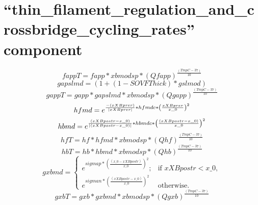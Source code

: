 \documentclass[10pt,landscape]{article}
\begin{document}
\section{``thin\_filament\_regulation\_and\_crossbridge\_cycling\_rates'' component}
\textbf{}
\begin{displaymath}fappT = fapp \ast xbmodsp \ast \left(Qfapp\right)^{\frac{\left(TmpC-37\right)}{10}}
\end{displaymath}
\textbf{}
\begin{displaymath}gapslmd = \left(1+\left(1-SOVFThick\right) \ast gslmod\right)
\end{displaymath}
\textbf{}
\begin{displaymath}gappT = gapp \ast gapslmd \ast xbmodsp \ast \left(Qgapp\right)^{\frac{\left(TmpC-37\right)}{10}}
\end{displaymath}
\textbf{}
\begin{displaymath}hfmd = e^{\frac{-(xXBprer)}{\arrowvert xXBprer\arrowvert} \ast hfmdc \ast \left(\frac{xXBprer}{x\_0}\right)^{2}}
\end{displaymath}
\textbf{}
\begin{displaymath}hbmd = e^{\frac{\left(xXBpostr-x\_0\right)}{\arrowvert\left(xXBpostr-x\_0\right)\arrowvert} \ast hbmdc \ast \left(\frac{\left(xXBpostr-x\_0\right)}{x\_0}\right)^{2}}
\end{displaymath}
\textbf{}
\begin{displaymath}hfT = hf \ast hfmd \ast xbmodsp \ast \left(Qhf\right)^{\frac{\left(TmpC-37\right)}{10}}
\end{displaymath}
\textbf{}
\begin{displaymath}hbT = hb \ast hbmd \ast xbmodsp \ast \left(Qhb\right)^{\frac{\left(TmpC-37\right)}{10}}
\end{displaymath}
\textbf{}
\begin{displaymath}gxbmd = 
\begin{cases}e^{sigmap \ast \left(\frac{\left(x\_0-xXBpostr\right)}{x\_0}\right)^{2}};
        &  \text{if }xXBpostr < x\_0,\\e^{sigman \ast \left(\frac{\left(xXBpostr-x\_0\right)}{x\_0}\right)^{2}}&  \text{otherwise}.
\end{cases}
\end{displaymath}
\textbf{}
\begin{displaymath}gxbT = gxb \ast gxbmd \ast xbmodsp \ast \left(Qgxb\right)^{\frac{\left(TmpC-37\right)}{10}}
\end{displaymath}
\end{document}
